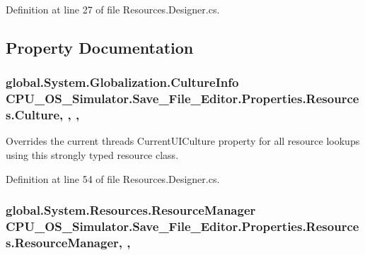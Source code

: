 Definition at line 27 of file Resources.\+Designer.\+cs.



\subsection{Property Documentation}
\hypertarget{class_c_p_u___o_s___simulator_1_1_save___file___editor_1_1_properties_1_1_resources_a599c178dcb474612d6d2918b305bde9a}{}
\subsubsection[{Culture}]{\setlength{\rightskip}{0pt plus 5cm}global.\+System.\+Globalization.\+Culture\+Info C\+P\+U\+\_\+\+O\+S\+\_\+\+Simulator.\+Save\+\_\+\+File\+\_\+\+Editor.\+Properties.\+Resources.\+Culture\hspace{0.3cm}{\ttfamily [static]}, {\ttfamily [get]}, {\ttfamily [set]}, {\ttfamily [package]}}\label{class_c_p_u___o_s___simulator_1_1_save___file___editor_1_1_properties_1_1_resources_a599c178dcb474612d6d2918b305bde9a}


Overrides the current thread\textquotesingle{}s Current\+U\+I\+Culture property for all resource lookups using this strongly typed resource class. 



Definition at line 54 of file Resources.\+Designer.\+cs.

\hypertarget{class_c_p_u___o_s___simulator_1_1_save___file___editor_1_1_properties_1_1_resources_a347fe7c7cfce80b52d1a40e25f8df7c0}{}
\subsubsection[{Resource\+Manager}]{\setlength{\rightskip}{0pt plus 5cm}global.\+System.\+Resources.\+Resource\+Manager C\+P\+U\+\_\+\+O\+S\+\_\+\+Simulator.\+Save\+\_\+\+File\+\_\+\+Editor.\+Properties.\+Resources.\+Resource\+Manager\hspace{0.3cm}{\ttfamily [static]}, {\ttfamily [get]}, {\ttfamily [package]}}\label{class_c_p_u___o_s___simulator_1_1_save___file___editor_1_1_properties_1_1_resources_a347fe7c7cfce80b52d1a40e25f8df7c0}


